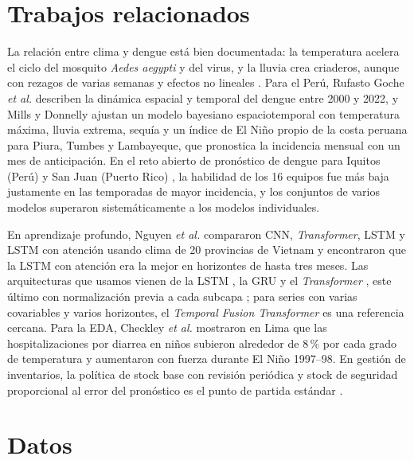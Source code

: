 \documentclass[conference,a4paper]{IEEEtran}
\begin{document}
\section{Trabajos relacionados}
La relación entre clima y dengue está bien documentada: la temperatura acelera el ciclo del mosquito \textit{Aedes aegypti} y del virus, y la lluvia crea criaderos, aunque con rezagos de varias semanas y efectos no lineales \cite{morin2013climate}. Para el Perú, Rufasto Goche \textit{et al.} \cite{rufasto2025peru} describen la dinámica espacial y temporal del dengue entre 2000 y 2022, y Mills y Donnelly \cite{mills2024peru} ajustan un modelo bayesiano espaciotemporal con temperatura máxima, lluvia extrema, sequía y un índice de El Niño propio de la costa peruana para Piura, Tumbes y Lambayeque, que pronostica la incidencia mensual con un mes de anticipación. En el reto abierto de pronóstico de dengue para Iquitos (Perú) y San Juan (Puerto Rico) \cite{johansson2019challenge}, la habilidad de los 16 equipos fue más baja justamente en las temporadas de mayor incidencia, y los conjuntos de varios modelos superaron sistemáticamente a los modelos individuales.

En aprendizaje profundo, Nguyen \textit{et al.} \cite{nguyen2022dengue} compararon CNN, \textit{Transformer}, LSTM y LSTM con atención usando clima de 20 provincias de Vietnam y encontraron que la LSTM con atención era la mejor en horizontes de hasta tres meses. Las arquitecturas que usamos vienen de la LSTM \cite{hochreiter1997lstm}, la GRU \cite{cho2014gru} y el \textit{Transformer} \cite{vaswani2017attention}, este último con normalización previa a cada subcapa \cite{xiong2020prenorm}; para series con varias covariables y varios horizontes, el \textit{Temporal Fusion Transformer} \cite{lim2021tft} es una referencia cercana. Para la EDA, Checkley \textit{et al.} \cite{checkley2000nino} mostraron en Lima que las hospitalizaciones por diarrea en niños subieron alrededor de 8\,\% por cada grado de temperatura y aumentaron con fuerza durante El Niño 1997--98. En gestión de inventarios, la política de stock base con revisión periódica y stock de seguridad proporcional al error del pronóstico es el punto de partida estándar \cite{silver2017inventory}.

\section{Datos}
\end{document}
